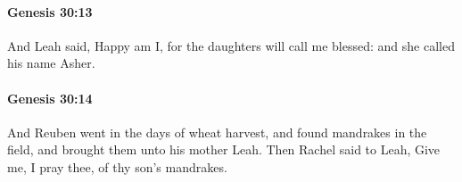 		\paragraph{Genesis 30:13} %
			\label{GENESIS-30-13}

			And Leah said, Happy am I, for the daughters will call me blessed: and she called his name Asher.


		\paragraph{Genesis 30:14} %
			\label{GENESIS-30-14}

			And Reuben went in the days of wheat harvest, and found mandrakes in the field, and brought them unto his mother Leah. Then Rachel said to Leah, Give me, I pray thee, of thy son's mandrakes.


